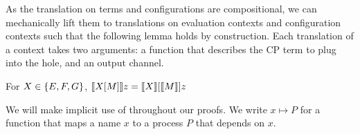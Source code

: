 \documentclass[oribibl,orivec,envcountsame]{llncs}
\begin{document}
As the translation on terms and configurations are compositional, we can mechanically lift them to
translations on evaluation contexts and configuration contexts such that the following lemma holds
by construction.
%
Each translation of a context takes two arguments: a function that describes the CP term to plug
into the hole, and an output channel.
%
%
\begin{lemma}
\label{lem:compositional-contexts}
For $X \in \{ E, F, G \}$, $\llbracket X[M] \rrbracket z = \llbracket X \rrbracket[\llbracket M \rrbracket]z$
\end{lemma}
%
We will make implicit use of  throughout our proofs. We write
$x \mapsto P$ for a function that maps a name $x$ to a process $P$ that depends on $x$.
\end{document}
